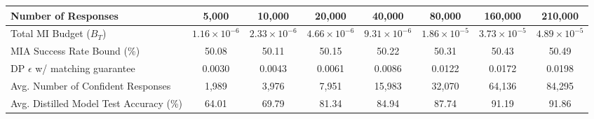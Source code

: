 \begin{tabular}{lccccccc}
\toprule
Number of Responses & 5,000 & 10,000 & 20,000 & 40,000 & 80,000 & 160,000 & 210,000 \\
\midrule
Total MI Budget ($B_T$) &  $1.16 \times 10^{-6}$ &  $2.33 \times 10^{-6}$ &  $4.66 \times 10^{-6}$ &  $9.31 \times 10^{-6}$ &  $1.86 \times 10^{-5}$ &  $3.73 \times 10^{-5}$ &  $4.89 \times 10^{-5}$ \\
MIA Success Rate Bound (\%) & 50.08 & 50.11 & 50.15 & 50.22 & 50.31 & 50.43 & 50.49 \\
DP $\epsilon$ w/ matching guarantee & 0.0030 & 0.0043 & 0.0061 & 0.0086 & 0.0122 & 0.0172 & 0.0198 \\
\midrule
Avg. Number of Confident Responses & 1,989 & 3,976 & 7,951 & 15,983 & 32,070 & 64,136 & 84,295 \\
Avg. Distilled Model Test Accuracy (\%) & 64.01 & 69.79 & 81.34 & 84.94 & 87.74 & 91.19 & 91.86 \\
\bottomrule
\end{tabular}
